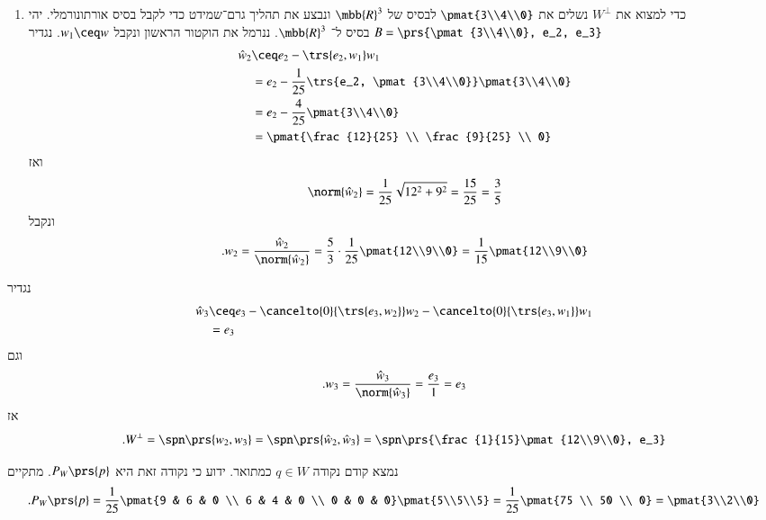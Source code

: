 \documentclass[a4paper,10pt,oneside,openany]{article}
\begin{document}
\begin{solution}
\begin{enumerate}
\item כדי למצוא את
$W^\perp$
נשלים את
$\pmat{3\\4\\0}$
לבסיס של
$\mbb{R}^3$
ונבצע את תהליך גרם־שמידט כדי לקבל בסיס אורתונורמלי.
יהי
$B = \prs{\pmat{3\\4\\0}, e_2, e_3}$
בסיס ל־%
$\mbb{R}^3$.
ננרמל את הוקטור הראשון ונקבל
$w_1 \ceq w$.
נגדיר
\begin{align*}
\hat{w}_2 &\ceq e_2 - \trs{e_2, w_1} w_1
\\&= e_2 - \frac{1}{25} \trs{e_2, \pmat{3\\4\\0}} \pmat{3\\4\\0}
\\&= e_2 - \frac{4}{25} \pmat{3\\4\\0}
\\&= \pmat{\frac{12}{25} \\ \frac{9}{25} \\ 0}
\end{align*}
ואז
\[\norm{\hat{w}_2} = \frac{1}{25} \sqrt{12^2 + 9^2} = \frac{15}{25} = \frac{3}{5}\]
ונקבל
\[\text{.} w_2 = \frac{\hat{w}_2}{\norm{\hat{w}_2}} = \frac{5}{3} \cdot \frac{1}{25} \pmat{12\\9\\0} = \frac{1}{15} \pmat{12\\9\\0}\]
\end{enumerate}
נגדיר
\begin{align*}
\hat{w}_3 &\ceq e_3 - \cancelto{0}{\trs{e_3, w_2}} w_2 - \cancelto{0}{\trs{e_3, w_1}}w_1
\\&=
e_3
\end{align*}
וגם
\[ \text{.} w_3 = \frac{\hat{w}_3}{\norm{\hat{w}_3}} = \frac{e_3}{1} = e_3\]
אז
\[\text{.} W^\perp = \spn\prs{w_2, w_3} = \spn\prs{\hat{w}_2, \hat{w}_3} = \spn\prs{\frac{1}{15}\pmat{12\\9\\0}, e_3}\]
\item
נמצא קודם נקודה
$q \in W$
כמתואר.
ידוע כי נקודה זאת היא
$P_W\prs{p}$.
מתקיים
\[\text{.} P_W\prs{p} = \frac{1}{25} \pmat{9 & 6 & 0 \\ 6 & 4 & 0 \\ 0 & 0 & 0} \pmat{5\\5\\5} = \frac{1}{25} \pmat{75 \\ 50 \\ 0} = \pmat{3\\2\\0}\]


\end{solution}
\end{document}

